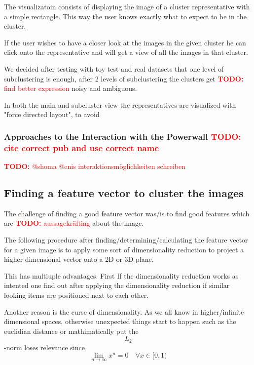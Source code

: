 \documentclass[journal]{vgtc}       %
\newcommand{\todo}[1]{\textcolor{red}{\textbf{TODO:} #1}}
\begin{document}
The visualizatoin consists of displaying the image of a cluster representative with a simple rectangle. 
This way the user knows exactly what to expect to be in the cluster.

If the user wishes to have a closer look at the images in the given cluster he can click onto the representative and will get a view of all the images in that cluster.

We decided after testing with toy test and real datasets that one level of subclustering is enough, after 2 levels of subclustering the clusters get \todo{find better expression}  noisy and ambiguous.

In both the main and subcluster view the representatives are visualized with "force directed layout", to avoid 



\subsubsection{Approaches to the Interaction with the Powerwall \todo{cite correct pub and use correct name}}

\todo{@shoma @enis interaktionsmöglichkeiten schreiben}


\subsection{Finding a feature vector to cluster the images}

The challenge of finding a good feature vector was/is to find good features which are \todo{aussagekräfting} about the image.

The following procedure after finding/determining/calculating the feature vector for a given image is to apply some sort of dimensionality reduction to project a higher dimensional vector onto a 2D or 3D plane.

This has multiuple advantages. First If the dimensionality reduction works as intented one find out after applying the dimensionality reduction if similar looking items are positioned next to each other.

Another reason is the curse of dimensionality. As we all know in higher/infinite dimensional spaces, otherwise unexpected things start to happen such as the euclidian distance or mathimatically put the \begin{equation} L_2 \end{equation}-norm loses relevance since
 \begin{equation}
   \lim_{n\rightarrow \infty} x^n = 0 \quad \forall x \in [0,1)
\end{equation}
\end{document}
